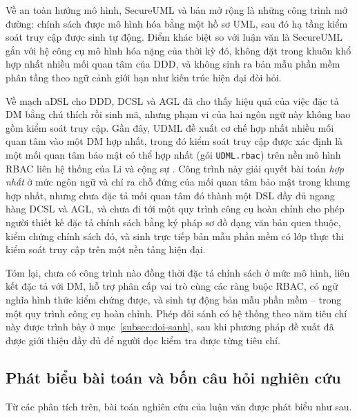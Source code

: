 Về an toàn hướng mô hình, SecureUML \cite{lodderstedt2002} và bản mở rộng \cite{basin2006} là những công trình mở đường: chính sách được mô hình hóa bằng một hồ sơ UML, sau đó hạ tầng kiểm soát truy cập được sinh tự động. Điểm khác biệt so với luận văn là SecureUML gắn với hệ công cụ mô hình hóa nặng của thời kỳ đó, không đặt trong khuôn khổ hợp nhất nhiều mối quan tâm của DDD, và không sinh ra bản mẫu phần mềm phân tầng theo ngữ cảnh giới hạn như kiến trúc hiện đại đòi hỏi.

Về mạch aDSL cho DDD, DCSL \cite{le2018dcsl,le2020} và AGL \cite{dang2023agl} đã cho thấy hiệu quả của việc đặc tả DM bằng chú thích rồi sinh mã, nhưng phạm vi của hai ngôn ngữ này không bao gồm kiểm soát truy cập. Gần đây, UDML \cite{le2025udml} đề xuất cơ chế hợp nhất nhiều mối quan tâm vào một DM hợp nhất, trong đó kiểm soát truy cập được xác định là một mối quan tâm bảo mật có thể hợp nhất (gói \texttt{UDML.rbac}) trên nền mô hình RBAC liên hệ thống của Li và cộng sự \cite{li2022}. Công trình này giải quyết bài toán \emph{hợp nhất} ở mức ngôn ngữ và chỉ ra chỗ đứng của mối quan tâm bảo mật trong khung hợp nhất, nhưng chưa đặc tả mối quan tâm đó thành một DSL đầy đủ ngang hàng DCSL và AGL, và chưa đi tới một quy trình công cụ hoàn chỉnh cho phép người thiết kế đặc tả chính sách bằng ký pháp sơ đồ dạng văn bản quen thuộc, kiểm chứng chính sách đó, và sinh trực tiếp bản mẫu phần mềm có lớp thực thi kiểm soát truy cập trên một nền tảng hiện đại.

Tóm lại, chưa có công trình nào đồng thời đặc tả chính sách ở mức mô hình, liên kết đặc tả với DM, hỗ trợ phân cấp vai trò cùng các ràng buộc RBAC, có ngữ nghĩa hình thức kiểm chứng được, và sinh tự động bản mẫu phần mềm -- trong một quy trình công cụ hoàn chỉnh. Phép đối sánh có hệ thống theo năm tiêu chí này được trình bày ở mục~\ref{subsec:doi-sanh}, sau khi phương pháp đề xuất đã được giới thiệu đầy đủ để người đọc kiểm tra được từng tiêu chí.

\subsection{Phát biểu bài toán và bốn câu hỏi nghiên cứu}
\label{subsec:phat-bieu-bai-toan}

Từ các phân tích trên, bài toán nghiên cứu của luận văn được phát biểu như sau.

